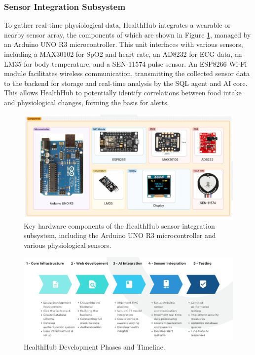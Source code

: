 \subsubsection{Sensor Integration Subsystem}
To gather real-time physiological data, HealthHub integrates a wearable or nearby sensor array, the components of which are shown in Figure \ref{fig:sensor-components}, managed by an Arduino UNO R3 microcontroller. This unit interfaces with various sensors, including a MAX30102 for SpO2 and heart rate, an AD8232 for ECG data, an LM35 for body temperature, and a SEN-11574 pulse sensor. An ESP8266 Wi-Fi module facilitates wireless communication, transmitting the collected sensor data to the backend for storage and real-time analysis by the SQL agent and AI core. This allows HealthHub to potentially identify correlations between food intake and physiological changes, forming the basis for alerts.

\begin{figure}[!t]
\centering
\includegraphics[width=\columnwidth]{figures/hm-sensors.png}
\caption{Key hardware components of the HealthHub sensor integration subsystem, including the Arduino UNO R3 microcontroller and various physiological sensors.}
\label{fig:sensor-components}
\end{figure}

\begin{figure}[!t]
\centering
\includegraphics[width=\columnwidth]{figures/hm-timeline.png}
\caption{HealthHub Development Phases and Timeline.}
\label{fig:development-timeline}
\end{figure}

